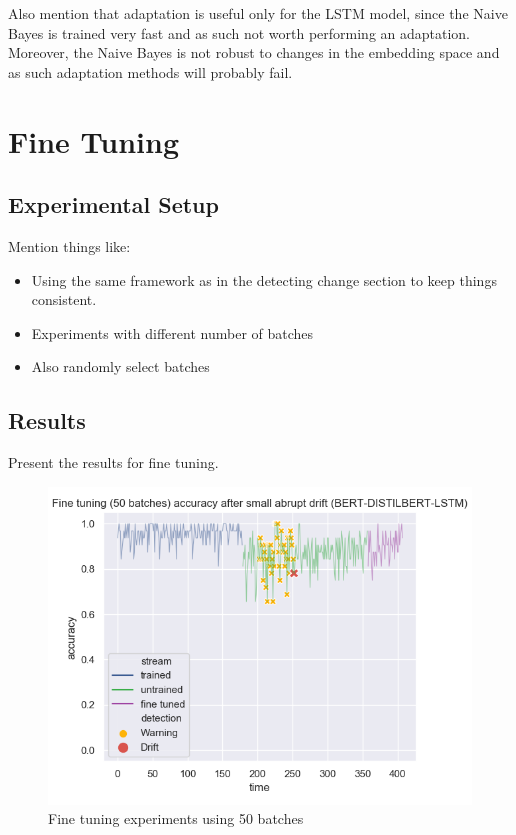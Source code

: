 \documentclass[12pt]{extreport}
\begin{document}
Also mention that adaptation is useful only for the LSTM model, since the Naive Bayes is trained very fast and as such not worth performing an adaptation. Moreover, the Naive Bayes is not robust to changes in the embedding space and as such adaptation methods will probably fail.

\section{Fine Tuning}

\subsection{Experimental Setup}

Mention things like:
\begin{itemize}
    \item Using the same framework as in the detecting change section to keep things consistent.
    \item Experiments with different number of batches
    \item Also randomly select batches
\end{itemize}

\subsection{Results}

Present the results for fine tuning.

\begin{figure}[ht!]
\centering
\includegraphics[width=0.8\linewidth]{assets/addressing-change/fine_tuning_lstm_wos_1_BERT_DISTILBERT_50_batches.png}
\caption{Fine tuning experiments using 50 batches}
\label{fig:fine50}
\end{figure}
\end{document}
